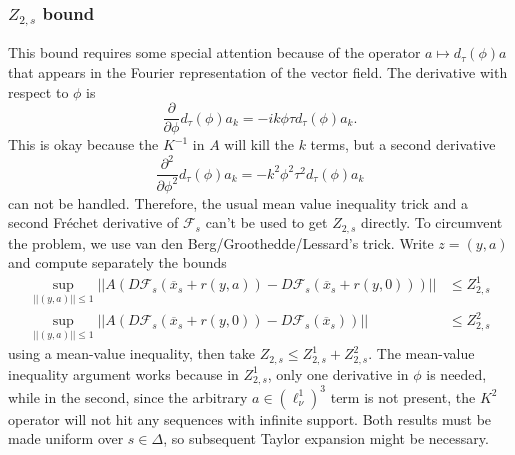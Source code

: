 \documentclass[10pt]{article}
\begin{document}
\subsubsection{$Z_{2,s}$ bound}
This bound requires some special attention because of the operator $a\mapsto d_\tau(\phi)a$ that appears in the Fourier representation of the vector field. The derivative with respect to $\phi$ is $$\frac{\partial}{\partial\phi}d_\tau(\phi)a_k = -ik\phi\tau d_\tau(\phi)a_k.$$ This is okay because the $K^{-1}$ in $A$ will kill the $k$ terms, but a second derivative $$\frac{\partial^2}{\partial\phi^2}d_\tau(\phi)a_k = -k^2\phi^2\tau^2 d_\tau(\phi)a_k$$
can not be handled. Therefore, the usual mean value inequality trick and a second Fr\'echet derivative of $\mathcal{F}_s$ can't be used to get $Z_{2,s}$ directly. To circumvent the problem, we use van den Berg/Groothedde/Lessard's trick. Write $z=(y,a)$ and compute separately the bounds
\begin{align*}
\sup_{||(y,a)||\leq 1}||A(D\mathcal{F}_s(\overline x_s + r(y,a)) - D\mathcal{F}_s(\overline x_s + r(y,0)))||&\leq Z_{2,s}^1\\
\sup_{||(y,a)||\leq 1}||A(D\mathcal{F}_s(\overline x_s + r(y,0)) - D\mathcal{F}_s(\overline x_s))||&\leq Z_{2,s}^2
\end{align*}
using a mean-value inequality, then take $Z_{2,s}\leq Z_{2,s}^1 + Z_{2,s}^2$. The mean-value inequality argument works because in $Z_{2,s}^1$, only one derivative in $\phi$ is needed, while in the second, since the arbitrary $a\in(\ell_\nu^1)^3$ term is not present, the $K^2$ operator will not hit any sequences with infinite support. Both results must be made uniform over $s\in\Delta$, so subsequent Taylor expansion might be necessary.
\end{document}
